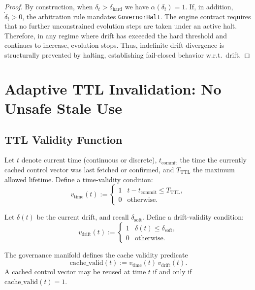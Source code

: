 \documentclass[11pt]{article}
\begin{document}
\begin{proof}
By construction, when $\delta_t > \delta_{\mathrm{hard}}$ we have $\alpha(\delta_t) = 1$.
If, in addition, $\dot{\delta}_t > 0$, the arbitration rule mandates \texttt{GovernorHalt}.
The engine contract requires that no further unconstrained evolution steps are taken under an active halt.
Therefore, in any regime where drift has exceeded the hard threshold and continues to increase, evolution stops.
Thus, indefinite drift divergence is structurally prevented by halting, establishing fail-closed behavior w.r.t.\ drift.
\end{proof}

\section{Adaptive TTL Invalidation: No Unsafe Stale Use}

\subsection{TTL Validity Function}

Let $t$ denote current time (continuous or discrete), $t_{\mathrm{commit}}$ the time the currently cached control vector was last fetched or confirmed, and $T_{\mathrm{TTL}}$ the maximum allowed lifetime.
Define a time-validity condition:
\begin{equation}
  v_{\mathrm{time}}(t) :=
  \begin{cases}
    1 & t - t_{\mathrm{commit}} \le T_{\mathrm{TTL}},\\
    0 & \text{otherwise}.
  \end{cases}
\end{equation}

Let $\delta(t)$ be the current drift, and recall $\delta_{\mathrm{soft}}$.
Define a drift-validity condition:
\begin{equation}
  v_{\mathrm{drift}}(t) :=
  \begin{cases}
    1 & \delta(t) \le \delta_{\mathrm{soft}},\\
    0 & \text{otherwise}.
  \end{cases}
\end{equation}

\begin{definition}
The governance manifold defines the cache validity predicate
\begin{equation}
  \mathrm{cache\_valid}(t) :=
  v_{\mathrm{time}}(t)\, v_{\mathrm{drift}}(t).
\end{equation}
A cached control vector may be reused at time $t$ if and only if $\mathrm{cache\_valid}(t) = 1$.
\end{definition}
\end{document}
